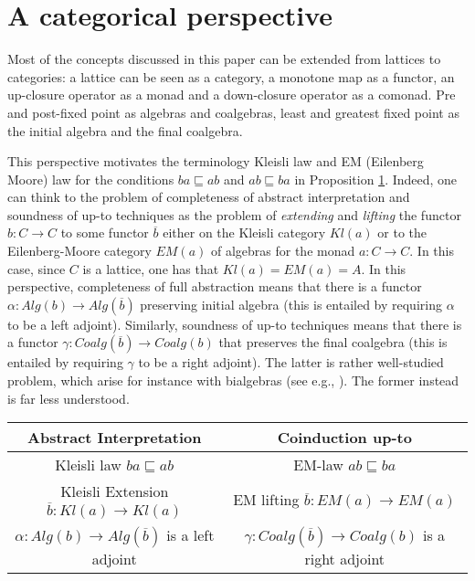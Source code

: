 \documentclass{llncs}
\begin{document}
\section{A categorical perspective}

Most of the concepts discussed in this paper can be extended from lattices to categories: a lattice can be seen as a category, a monotone map as a functor, an up-closure operator as a monad and a down-closure operator as a comonad. Pre and post-fixed point as algebras and coalgebras, least and greatest fixed point as the initial algebra and the final coalgebra. 

\medskip

This perspective motivates the terminology Kleisli law and EM (Eilenberg Moore) law for the conditions $ba \sqsubseteq ab$ and $ab \sqsubseteq ba$ in Proposition \ref{}. Indeed, one can think to the problem of completeness of abstract interpretation and soundness of up-to techniques as the problem of \emph{extending} and \emph{lifting} the functor $b\colon C \to C$ to some functor $\overline{b}$ either on the Kleisli category $Kl(a)$ or to the Eilenberg-Moore category $EM(a)$ of algebras for the monad $a\colon C \to C$. In this case, since $C$ is a lattice, one has that $Kl(a) = EM(a) =A$. In this perspective, completeness of full abstraction means that there is a functor $\alpha \colon Alg(b) \to Alg(\overline{b})$ preserving initial algebra (this is entailed by requiring $\alpha$ to be a left adjoint). Similarly, soundness of up-to techniques means that there is a functor $\gamma \colon Coalg(\overline{b}) \to Coalg (b)$ that preserves the final coalgebra (this is entailed by requiring $\gamma$ to be a right adjoint). The latter is rather well-studied problem, which arise for instance with bialgebras (see e.g., \cite{DBLP:journals/tcs/Klin11,turi1997towards}). The former instead is far less understood. 

\medskip

\begin{tabular}{cc}
Abstract Interpretation & Coinduction up-to\\
\hline
Kleisli law $ba \sqsubseteq ab$ & EM-law $ab \sqsubseteq ba$  \\
Kleisli Extension $\overline{b} \colon Kl(a) \to Kl(a)$ & EM lifting $\overline{b} \colon EM(a) \to EM(a)$\\
$\alpha \colon Alg(b) \to Alg(\overline{b})$ is a left adjoint & $\gamma \colon Coalg(\overline{b}) \to Coalg (b)$ is a right adjoint \\
\end{tabular}
\end{document}

